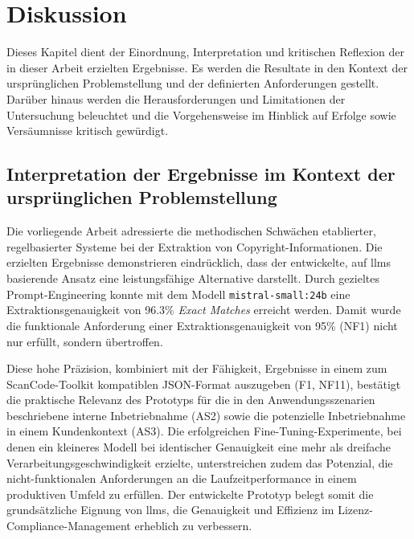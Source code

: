 \chapter{Diskussion}\label{ch:diskussion}

Dieses Kapitel dient der Einordnung, Interpretation und kritischen Reflexion der in dieser Arbeit erzielten Ergebnisse.
Es werden die Resultate in den Kontext der ursprünglichen Problemstellung und der definierten Anforderungen gestellt.
Darüber hinaus werden die Herausforderungen und Limitationen der Untersuchung beleuchtet und die Vorgehensweise im Hinblick auf Erfolge sowie Versäumnisse kritisch gewürdigt.


\section{Interpretation der Ergebnisse im Kontext der ursprünglichen Problemstellung}

Die vorliegende Arbeit adressierte die methodischen Schwächen etablierter, regelbasierter Systeme bei der Extraktion von Copyright-Informationen.
Die erzielten Ergebnisse demonstrieren eindrücklich, dass der entwickelte, auf \glspl{llm} basierende Ansatz eine leistungsfähige Alternative darstellt.
Durch gezieltes Prompt-Engineering konnte mit dem Modell \texttt{mistral-small:24b} eine Extraktionsgenauigkeit von \num{96,3}\% \textit{Exact Matches} erreicht werden.
Damit wurde die funktionale Anforderung einer Extraktionsgenauigkeit von \num{95}\% (NF1) nicht nur erfüllt, sondern übertroffen.

Diese hohe Präzision, kombiniert mit der Fähigkeit, Ergebnisse in einem zum ScanCode-Toolkit kompatiblen JSON-Format auszugeben (F1, NF11), bestätigt die praktische Relevanz des Prototyps für die in den Anwendungsszenarien beschriebene interne Inbetriebnahme (AS2) sowie die potenzielle Inbetriebnahme in einem Kundenkontext (AS3).
Die erfolgreichen Fine-Tuning-Experimente, bei denen ein kleineres Modell bei identischer Genauigkeit eine mehr als dreifache Verarbeitungsgeschwindigkeit erzielte, unterstreichen zudem das Potenzial, die nicht-funktionalen Anforderungen an die Laufzeitperformance in einem produktiven Umfeld zu erfüllen.
Der entwickelte Prototyp belegt somit die grundsätzliche Eignung von \glspl{llm}, die Genauigkeit und Effizienz im Lizenz-Compliance-Management erheblich zu verbessern.

